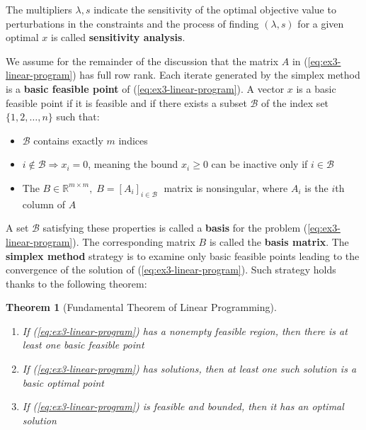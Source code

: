 \documentclass[unicode,11pt,a4paper,oneside,numbers=endperiod,openany, draft]{scrartcl}
\newtheorem{theorem}{Theorem}[section]
\newcommand{\myth}[3]{
    \begin{theorem}[#1] 
        \label{#2} 
        #3 
    \end{theorem}
}
\begin{document}
\noindent The multipliers \( \lambda, s \) indicate the sensitivity of the optimal objective value
to perturbations in the constraints
and the process of finding \( ( \lambda, s) \) for a given optimal \( x \)
is called \textbf{sensitivity analysis}.

We assume for the remainder of the discussion that the matrix \( A \)
in (\ref{eq:ex3-linear-program}) has full row rank.
Each iterate generated by the simplex method is a \textbf{basic feasible point}
of (\ref{eq:ex3-linear-program}).
A vector \( x \) is a basic feasible point
if it is feasible and if there exists a subset \( \mathcal{B} \) of the index set
\( \{ 1, 2, \ldots, n \} \) such that:

\begin{itemize}
    \item \( \mathcal{B} \) contains exactly \( m \) indices
    \item \( i \notin \mathcal{B} \Rightarrow x_i = 0 \),
          meaning the bound \( x_i \geq 0 \) can be inactive only if \( i \in \mathcal{B} \)
    \item The \( B \in \mathbb{R}^{m \times m}, \; B = [A_i]_{i \in \mathcal{B}} \; \)
          matrix is nonsingular, where \( A_i \) is the \( i \)th column of \( A \)
\end{itemize}

A set \( \mathcal{B} \) satisfying these properties is called a \textbf{basis}
for the problem (\ref{eq:ex3-linear-program}).
The corresponding matrix \( B \) is called the \textbf{basis matrix}.
The \textbf{simplex method} strategy is to examine only basic feasible points
leading to the convergence of the solution of (\ref{eq:ex3-linear-program}).
Such strategy holds thanks to the following theorem:

\myth{Fundamental Theorem of Linear Programming}{th:ex3-linear-programming}{
    \hfill
    \begin{enumerate}
        \item If (\ref{eq:ex3-linear-program}) has a nonempty feasible region,
              then there is at least one basic feasible point
        \item If (\ref{eq:ex3-linear-program}) has solutions,
              then at least one such solution is a basic optimal point
        \item If (\ref{eq:ex3-linear-program}) is feasible and bounded,
              then it has an optimal solution
    \end{enumerate}
}
\end{document}
